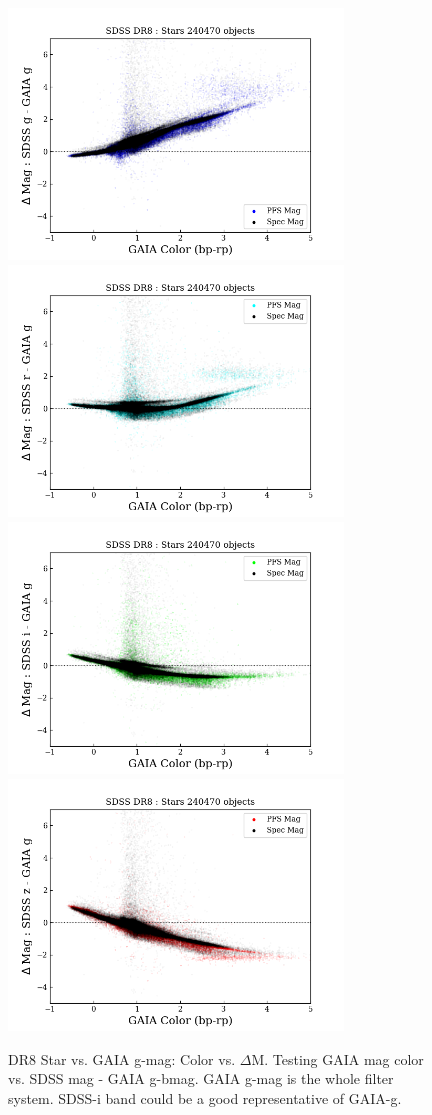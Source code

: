 \documentclass[apj,twocolumn]{aastex631}
\begin{document}
\begin{figure}%
\begin{center}
\includegraphics[angle=0,width=8.9cm]{figures/20220812_color_dmag_g_dr8star.png}
\includegraphics[angle=0,width=8.9cm]{figures/20220812_color_dmag_r_dr8star.png}
\includegraphics[angle=0,width=8.9cm]{figures/20220812_color_dmag_i_dr8star.png}
\includegraphics[angle=0,width=8.9cm]{figures/20220812_color_dmag_z_dr8star.png}
\caption{DR8 Star vs. GAIA g-mag: Color vs. $\Delta$M.  Testing GAIA mag color vs. SDSS mag - GAIA g-bmag.   GAIA g-mag is the whole filter system. SDSS-i band could be a good representative of GAIA-g.}
\end{center}
\end{figure}
\end{document}
